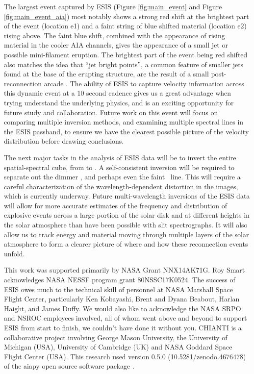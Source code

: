 	The largest event captured by ESIS (Figure \ref{fig:main_event} and Figure \ref{fig:main_event_aia}) most notably shows a strong red shift at the brightest part of the event (location e1) and a faint string of blue shifted material (location e2) rising above.
	The faint blue shift, combined with the appearance of rising material in the cooler AIA channels, gives the appearance of a small jet or possible mini-filament eruption.
	The brightest part of the event being red shifted also matches the idea that ``jet bright points'', a common feature of smaller jets found at the base of the erupting structure, are the result of a small post-reconnection arcade \citep[see][and references therein]{Sterling2015}.
	The ability of ESIS to capture velocity information across this dynamic event at a 10 second cadence gives us a great advantage when trying understand the underlying physics, and is an exciting opportunity for future study and collaboration.
	Future work on this event will focus on comparing multiple inversion methods, and examining multiple spectral lines in the ESIS passband, to ensure we have the clearest possible picture of the velocity distribution before drawing conclusions.
	
	The next major tasks in the analysis of ESIS data will be to invert the entire spatial-spectral cube, from  to . 
	A self-consistent inversion will be required to separate out the dimmer \mgxdim, and perhaps even the faint \oiii \ line. This will require a careful characterization of the wavelength-dependent distortion in the images, which is currently underway.
	Future multi-wavelength inversions of the ESIS data will allow for more accurate estimates of the frequency and distribution of explosive events across a large portion of the solar disk and at different heights in the solar atmosphere than have been possible with slit spectrographs.
	It will also allow us to track energy and material moving through multiple layers of the solar atmosphere to form a clearer picture of where and how these reconnection events unfold. 
	

\acknowledgements
	This work was supported primarily by NASA Grant NNX14AK71G.
	Roy Smart acknowledges NASA NESSF program grant 80NSSC17K0524. The success of ESIS owes much to the  technical skill of personnel at NASA Marshall Space Flight Center, particularly Ken Kobayashi, Brent and Dyana Beabout, Harlan Haight, and James Duffy.
	We would also like to acknowledge the NASA SRPO and NSROC employees involved, all of whom went above and beyond to support ESIS from start to finish, we couldn't have done it without you. 
	CHIANTI is a collaborative project involving George Mason University, the University of Michigan (USA), University of Cambridge (UK) and NASA Goddard Space Flight Center (USA).
	This research used version 0.5.0 (10.5281/zenodo.4676478) of the aiapy open source software package \citep{aiapy}.




